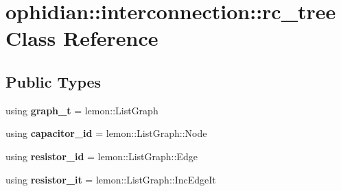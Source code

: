 \hypertarget{classophidian_1_1interconnection_1_1rc__tree}{\section{ophidian\-:\-:interconnection\-:\-:rc\-\_\-tree Class Reference}
\label{classophidian_1_1interconnection_1_1rc__tree}
}
\subsection*{Public Types}
\begin{DoxyCompactItemize}
\item 
\hypertarget{classophidian_1_1interconnection_1_1rc__tree_a3150567e8388e615a01021accf9544a2}{using {\bfseries graph\-\_\-t} = lemon\-::\-List\-Graph}\label{classophidian_1_1interconnection_1_1rc__tree_a3150567e8388e615a01021accf9544a2}

\item 
\hypertarget{classophidian_1_1interconnection_1_1rc__tree_a924f23b7ccb8c4fcc9a0782efd0fd96b}{using {\bfseries capacitor\-\_\-id} = lemon\-::\-List\-Graph\-::\-Node}\label{classophidian_1_1interconnection_1_1rc__tree_a924f23b7ccb8c4fcc9a0782efd0fd96b}

\item 
\hypertarget{classophidian_1_1interconnection_1_1rc__tree_a6f88448d10474e21d5c341f598154b0a}{using {\bfseries resistor\-\_\-id} = lemon\-::\-List\-Graph\-::\-Edge}\label{classophidian_1_1interconnection_1_1rc__tree_a6f88448d10474e21d5c341f598154b0a}

\item 
\hypertarget{classophidian_1_1interconnection_1_1rc__tree_abd7eab88b02ff1c1f70e2f6f6fe495b7}{using {\bfseries resistor\-\_\-it} = lemon\-::\-List\-Graph\-::\-Inc\-Edge\-It}\label{classophidian_1_1interconnection_1_1rc__tree_abd7eab88b02ff1c1f70e2f6f6fe495b7}

\end{DoxyCompactItemize}
